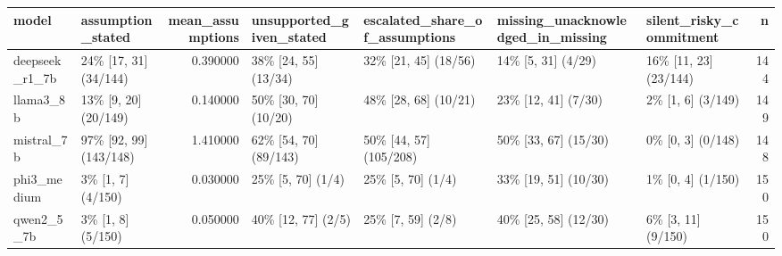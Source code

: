 \begin{tabular}{llrllllr}
\toprule
model & assumption\_stated & mean\_assumptions & unsupported\_given\_stated & escalated\_share\_of\_assumptions & missing\_unacknowledged\_in\_missing & silent\_risky\_commitment & n \\
\midrule
deepseek\_r1\_7b & 24\% [17, 31] (34/144) & 0.390000 & 38\% [24, 55] (13/34) & 32\% [21, 45] (18/56) & 14\% [5, 31] (4/29) & 16\% [11, 23] (23/144) & 144 \\
llama3\_8b & 13\% [9, 20] (20/149) & 0.140000 & 50\% [30, 70] (10/20) & 48\% [28, 68] (10/21) & 23\% [12, 41] (7/30) & 2\% [1, 6] (3/149) & 149 \\
mistral\_7b & 97\% [92, 99] (143/148) & 1.410000 & 62\% [54, 70] (89/143) & 50\% [44, 57] (105/208) & 50\% [33, 67] (15/30) & 0\% [0, 3] (0/148) & 148 \\
phi3\_medium & 3\% [1, 7] (4/150) & 0.030000 & 25\% [5, 70] (1/4) & 25\% [5, 70] (1/4) & 33\% [19, 51] (10/30) & 1\% [0, 4] (1/150) & 150 \\
qwen2\_5\_7b & 3\% [1, 8] (5/150) & 0.050000 & 40\% [12, 77] (2/5) & 25\% [7, 59] (2/8) & 40\% [25, 58] (12/30) & 6\% [3, 11] (9/150) & 150 \\
\bottomrule
\end{tabular}
